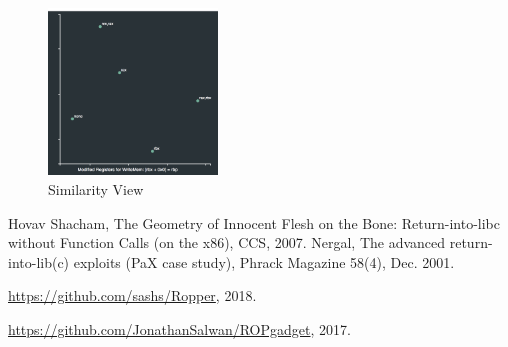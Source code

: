 \documentclass[twocolumn, 11pt]{article}
\begin{document}
\begin{figure}[htb]
\centering
 \includegraphics[width=0.4\textwidth]{mds}
 \caption{Similarity View}\label{fig:mds}
\end{figure}



\begin{thebibliography}{99}
    Hovav Shacham,
    The Geometry of Innocent Flesh on the Bone: Return-into-libc without Function Calls (on the x86),
    CCS,
    2007.
    Nergal,
    The advanced return-into-lib(c) exploits (PaX case study),
    Phrack Magazine 58(4),
    Dec. 2001.

     \url{https://github.com/sashs/Ropper},
    2018.

    \url{https://github.com/JonathanSalwan/ROPgadget},
    2017.

\end{thebibliography}
\end{document}
